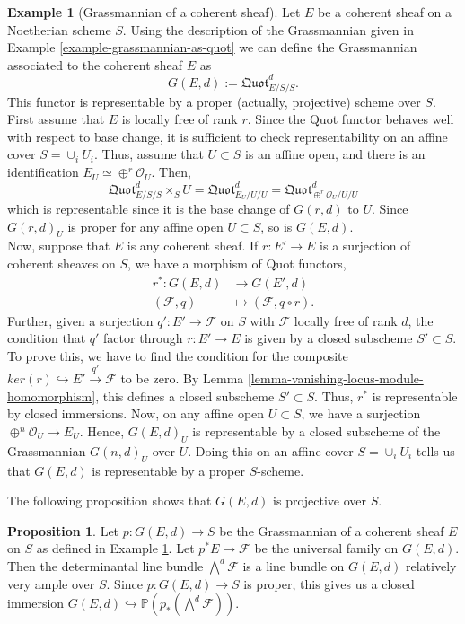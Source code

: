 \documentclass[11pt]{amsart}
\newcommand{\sF}{{\mathcal F}}
\newcommand{\sO}{{\mathcal O}}
\renewcommand{\P}{{\mathbb P}}
\theoremstyle{definition}
\newtheorem{proposition}[theorem]{Proposition}
\newtheorem{example}[theorem]{Example}
\begin{document}
\begin{example}[Grassmannian of a coherent sheaf]
	\label{example-grassmannian-coherent-sheaf}
	Let $E$ be a coherent sheaf on a Noetherian scheme $S$. Using the description of the Grassmannian given in Example \ref{example-grassmannian-as-quot} we can define the Grassmannian associated to the coherent sheaf $E$ as
	\[G(E,d):=\mathfrak{Quot}^d_{E/S/S}.\] 
	This functor is representable by a proper (actually, projective) scheme over $S$.\\
	First assume that $E$ is locally free of rank $r$. Since the Quot functor behaves well with respect to base change, it is sufficient to check representability on an affine cover $S=\cup_i U_i$. Thus, assume that $U\subset S$ is an affine open, and there is an identification $E_U\simeq \oplus^r\sO_U$. Then,
	\[\mathfrak{Quot}^d_{E/S/S}\times_S U = \mathfrak{Quot}^d_{E_U/U/U}=\mathfrak{Quot}^d_{\oplus^r\sO_U/U/U}\]
	which is representable since it is the base change of $G(r,d)$ to $U$. Since $G(r,d)_U$ is proper for any affine open $U\subset S$, so is $G(E,d)$.\\
	Now, suppose that $E$ is any coherent sheaf. If $r: E'\rightarrow E$ is a surjection of coherent sheaves on $S$, we have a morphism of Quot functors,
	\begin{align*}
	r^*: G(E,d) &\rightarrow G(E',d)\\
	(\sF,q) &\mapsto (\sF,q\circ r).
	\end{align*}
	Further, given a surjection $q':E'\rightarrow\sF$ on $S$ with $\sF$ locally free of rank $d$, the condition that $q'$ factor through $r:E'\rightarrow E$ is given by a closed subscheme $S'\subset S$. To prove this, we have to find the condition for the composite $ker(r)\hookrightarrow E'\overset{q'}{\rightarrow}\sF$ to be zero. By Lemma \ref{lemma-vanishing-locus-module-homomorphism}, this defines a closed subscheme $S'\subset S$. Thus, $r^*$ is representable by closed immersions. Now, on any affine open $U\subset S$, we have a surjection $\oplus^n\sO_U\rightarrow E_U$. Hence, $G(E,d)_U$ is representable by a closed subscheme of the Grassmannian $G(n,d)_U$ over $U$. Doing this on an affine cover $S=\cup_i U_i$ tells us that $G(E,d)$ is representable by a proper $S$-scheme.
\end{example}

The following proposition shows that $G(E,d)$ is projective over $S$.

\begin{proposition}
	Let $p:G(E,d)\rightarrow S$ be the Grassmannian of a coherent sheaf $E$ on $S$ as defined in Example \ref{example-grassmannian-coherent-sheaf}. Let $p^*E\rightarrow \sF$ be the universal family on $G(E,d)$. Then the determinantal line bundle $\bigwedge^d \sF$ is a line bundle on $G(E,d)$ relatively very ample over $S$. Since $p:G(E,d)\rightarrow S$ is proper, this gives us a closed immersion $G(E,d)\hookrightarrow \P(p_*(\bigwedge^d \sF))$.
\end{proposition}
\end{document}
